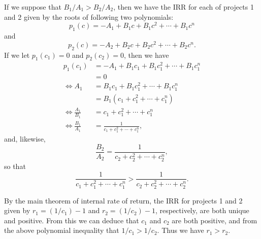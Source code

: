 If we suppose that $B_1 / A_1 > B_2 / A_2$, then we have the IRR for each of
projects 1 and 2 given by the roots of following two polynomials:
\[
    p_1(c) = -A_1 + B_1c + B_1c^2 + \cdots + B_1c^n
\]
and
\[
    p_2(c) = -A_2 + B_2c + B_2c^2 + \cdots + B_2c^n.
\]
If we let $p_1(c_1) = 0$ and $p_2(c_2) = 0$, then we have
\begin{equation*}
    \begin{split}
        p_1(c_1) &= -A_1 + B_1c_1 + B_1c_1^2 + \cdots + B_1c_1^n \\
        &= 0 \\
        \Leftrightarrow A_1 &= B_1c_1 + B_1c_1^2 + \cdots + B_1c_1^n \\
        &= B_1(c_1 + c_1^2 + \cdots + c_1^n) \\
        \Leftrightarrow \frac{A_1}{B_1} &= c_1 + c_1^2 + \cdots + c_1^n \\
        \Leftrightarrow \frac{B_1}{A_1} &= \frac{1}{c_1 + c_1^2 + \cdots + c_1^n},
    \end{split}
\end{equation*}
and, likewise,
\[
    \frac{B_2}{A_2} = \frac{1}{c_2 + c_2^2 + \cdots + c_2^n},
\]
so that
\[
    \frac{1}{c_1 + c_1^2 + \cdots + c_1^n}
    > \frac{1}{c_2 + c_2^2 + \cdots + c_2^n}.
\]

By the main theorem of internal rate of return, the IRR for projects 1 and 2
given by $r_1 = (1/c_1) - 1$ and $r_2 = (1/c_2) - 1$, respectively, are both
unique and positive. From this we can deduce that $c_1$ and $c_2$ are both
positive, and from the above polynomial inequality that $1/c_1 > 1/c_2$. Thus
we have $r_1 > r_2$.
